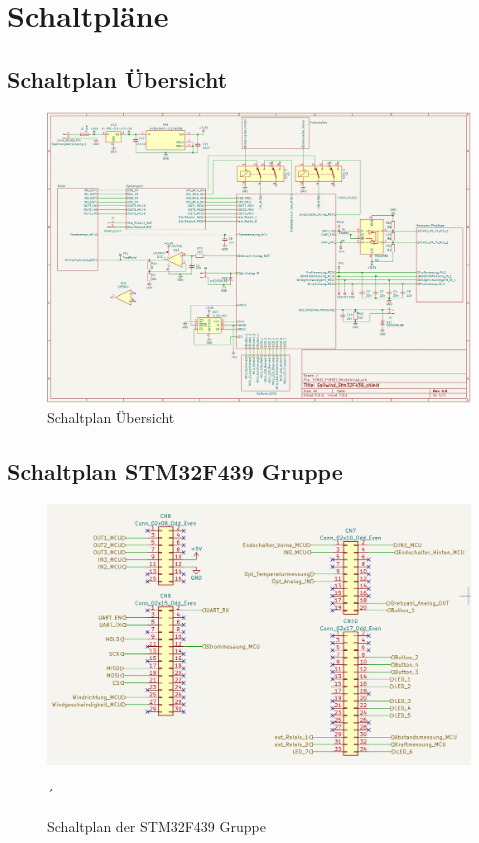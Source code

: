 \appendix
\section{Schaltpläne}
\label{sec:Schaltplan}
\subsection{Schaltplan Übersicht}
\begin{figure}[H]
	\centering
	\includegraphics[width=1.0\textwidth]{images/Hardware/Schaltplan_Gesamt.PNG}
	\caption{Schaltplan Übersicht}
	\label{fig:Schaltplanuebersicht}\begin{center}
	\end{center}
\end{figure}
\subsection{Schaltplan STM32F439 Gruppe}
\begin{figure}[H]
	\centering
	\includegraphics[width=1.0\textwidth]{images/Hardware/Schaltplan_STM32.PNG}
	\caption{Schaltplan der STM32F439 Gruppe}
	\label{fig:STM32Gruppe}\begin{center}´
	\end{center}
\end{figure}
